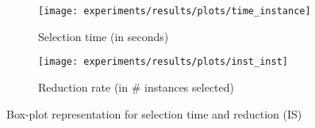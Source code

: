 \documentclass[preprint,12pt]{elsarticle}
\begin{document}
\begin{itemize}
\begin{figure}
\begin{subfigure}{.5\textwidth}
  \centering
  \texttt{[image: experiments/results/plots/time\_instance]}
  \caption{Selection time (in seconds)}
  \label{fig:time-isel}
\end{subfigure}%
\begin{subfigure}{.5\textwidth}
  \centering
  \texttt{[image: experiments/results/plots/inst\_inst]}
  \caption{Reduction rate (in \# instances selected)}
  \label{fig:inst-isel}
\end{subfigure}
\caption{Box-plot representation for selection time and reduction (IS)}
\label{fig:isel}
\end{figure}

%

\end{itemize}
\end{document}
